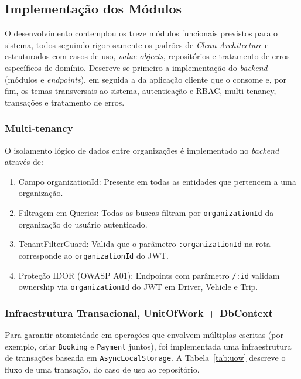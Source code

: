 \documentclass[12pt,openright,oneside,a4paper]{article}
\begin{document}
\subsection{Implementação dos Módulos}
\label{sec:implementacao}

O desenvolvimento contemplou os treze módulos funcionais previstos para o sistema, todos seguindo rigorosamente os padrões de \textit{Clean Architecture} e estruturados com casos de uso, \textit{value objects}, repositórios e tratamento de erros específicos de domínio. Descreve-se primeiro a implementação do \textit{backend} (módulos e \textit{endpoints}), em seguida a da aplicação cliente que o consome e, por fim, os temas transversais ao sistema, autenticação e RBAC, multi-tenancy, transações e tratamento de erros.




\subsubsection{Multi-tenancy}

O isolamento lógico de dados entre organizações é implementado no \textit{backend} através de:
\begin{enumerate}
\item Campo organizationId: Presente em todas as entidades que pertencem a uma organização.
\item Filtragem em Queries: Todas as buscas filtram por \texttt{organizationId} da organização do usuário autenticado.
\item TenantFilterGuard: Valida que o parâmetro \texttt{:organizationId} na rota corresponde ao \texttt{organizationId} do JWT.
\item Proteção IDOR (OWASP A01): Endpoints com parâmetro \texttt{/:id} validam ownership via \texttt{organizationId} do JWT em Driver, Vehicle e Trip.
\end{enumerate}

\subsubsection{Infraestrutura Transacional, UnitOfWork + DbContext}

Para garantir atomicidade em operações que envolvem múltiplas escritas (por exemplo, criar \texttt{Booking} e \texttt{Payment} juntos), foi implementada uma infraestrutura de transações baseada em \texttt{AsyncLocalStorage}. A Tabela~\ref{tab:uow} descreve o fluxo de uma transação, do caso de uso ao repositório.
\end{document}
